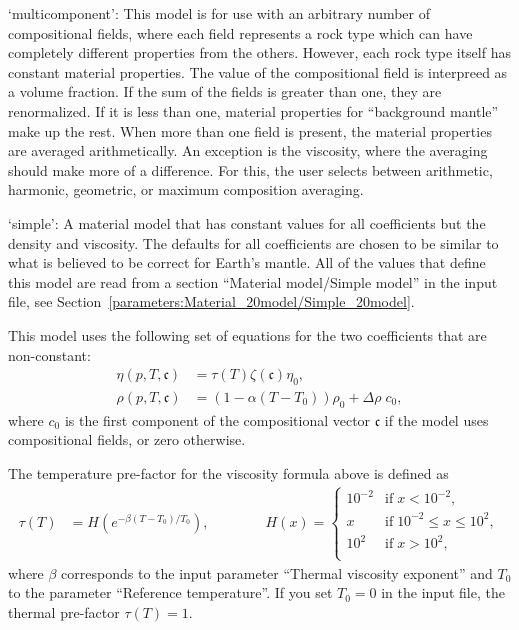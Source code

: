\begin{itemize}
`multicomponent': This model is for use with an arbitrary number of compositional fields, where each field represents a rock type which can have completely different properties from the others. However, each rock type itself has constant material properties.  The value of the  compositional field is interpreed as a volume fraction. If the sum of the fields is greater than one, they are renormalized.  If it is less than one, material properties  for ``background mantle'' make up the rest. When more than one field is present, the material properties are averaged arithmetically.  An exception is the viscosity, where the averaging should make more of a difference.  For this, the user selects between arithmetic, harmonic, geometric, or maximum composition averaging.

`simple': A material model that has constant values for all coefficients but the density and viscosity. The defaults for all coefficients are chosen to be similar to what is believed to be correct for Earth's mantle. All of the values that define this model are read from a section ``Material model/Simple model'' in the input file, see Section~\ref{parameters:Material_20model/Simple_20model}.

This model uses the following set of equations for the two coefficients that are non-constant: \begin{align}  \eta(p,T,\mathfrak c) &= \tau(T) \zeta(\mathfrak c) \eta_0, \\  \rho(p,T,\mathfrak c) &= \left(1-\alpha (T-T_0)\right)\rho_0 + \Delta\rho \; c_0,\end{align}where $c_0$ is the first component of the compositional vector $\mathfrak c$ if the model uses compositional fields, or zero otherwise. 

The temperature pre-factor for the viscosity formula above is defined as \begin{align}  \tau(T) &= H\left(e^{-\beta (T-T_0)/T_0}\right),  \qquad\qquad H(x) = \begin{cases}                            10^{-2} & \text{if}\; x<10^{-2}, \\                            x & \text{if}\; 10^{-2}\le x \le 10^2, \\                            10^{2} & \text{if}\; x>10^{2}, \\                         \end{cases}\end{align} where $\beta$ corresponds to the input parameter ``Thermal viscosity exponent'' and $T_0$ to the parameter ``Reference temperature''. If you set $T_0=0$ in the input file, the thermal pre-factor $\tau(T)=1$.


\end{itemize}
